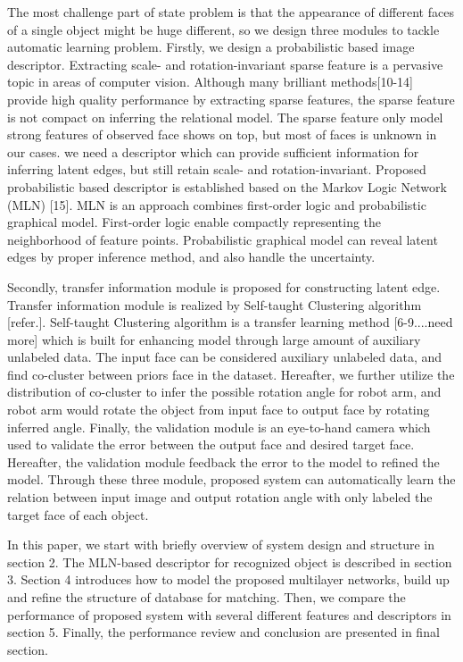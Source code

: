 \documentclass[journal]{IEEEtran}
\begin{document}
The most challenge part of state problem is that the appearance of different faces of a single object might be huge different, so we design three modules to tackle automatic learning problem. Firstly, we design a probabilistic based image descriptor. Extracting scale- and rotation-invariant sparse feature is a pervasive topic in areas of computer vision. Although many brilliant methods[10-14] provide high quality performance by extracting sparse features, the sparse feature is not compact on inferring the relational model. The sparse feature only model strong features of observed face shows on top, but most of faces is unknown in our cases. we need a descriptor which can provide sufficient information for inferring latent edges, but still retain scale- and rotation-invariant. Proposed probabilistic based descriptor is established based on the Markov Logic Network (MLN) [15]. MLN is an approach combines first-order logic and probabilistic graphical model. First-order logic enable compactly representing the neighborhood of feature points. Probabilistic graphical model can reveal latent edges by proper inference method, and also handle the uncertainty. 

Secondly, transfer information module is proposed for constructing latent edge. Transfer information module is realized by Self-taught Clustering algorithm [refer.]. Self-taught Clustering algorithm is a transfer learning method [6-9....need more] which is built for enhancing model through large amount of auxiliary unlabeled data. The input face can be considered auxiliary unlabeled data, and find co-cluster between priors face in the dataset. Hereafter, we further utilize the distribution of co-cluster to infer the possible rotation angle for robot arm, and robot arm would rotate the object from input face to output face by rotating inferred angle. Finally, the validation module is an eye-to-hand camera which used to validate the error between the output face and desired target face. Hereafter, the validation module feedback the error to the model to refined the model. Through these three module, proposed system can automatically learn the relation between input image and output rotation angle with only labeled the target face of each object.

In this paper, we start with briefly overview of system design and structure in section 2. The MLN-based descriptor for recognized object is described in section 3. Section 4 introduces how to model the proposed multilayer networks, build up and refine the structure of database for matching. Then, we compare the performance of proposed system with several different features and descriptors in section 5. Finally, the performance review and conclusion are presented in final section.
\end{document}
